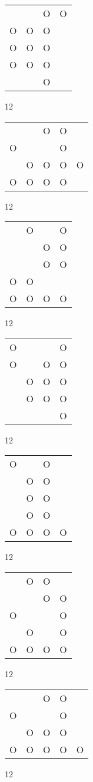 \begin{tabular}{|m{0.2cm}m{0.2cm}m{0.2cm}m{0.2cm}|}\hline
 & &O&O\\
O&O&O& \\
O&O&O& \\
O&O&O& \\
 & &O& \\
\hline\end{tabular}12
\begin{tabular}{|m{0.2cm}m{0.2cm}m{0.2cm}m{0.2cm}m{0.2cm}|}\hline
 & &O&O& \\
O& & &O& \\
 &O&O&O&O\\
O&O&O&O& \\
\hline\end{tabular}12
\begin{tabular}{|m{0.2cm}m{0.2cm}m{0.2cm}m{0.2cm}|}\hline
 &O& &O\\
 & &O&O\\
 & &O&O\\
O&O& & \\
O&O&O&O\\
\hline\end{tabular}12
\begin{tabular}{|m{0.2cm}m{0.2cm}m{0.2cm}m{0.2cm}|}\hline
O& & &O\\
O& &O&O\\
 &O&O&O\\
 &O&O&O\\
 & & &O\\
\hline\end{tabular}12
\begin{tabular}{|m{0.2cm}m{0.2cm}m{0.2cm}m{0.2cm}|}\hline
O& &O& \\
 &O&O& \\
 &O&O& \\
 &O&O& \\
O&O&O&O\\
\hline\end{tabular}12
\begin{tabular}{|m{0.2cm}m{0.2cm}m{0.2cm}m{0.2cm}|}\hline
 &O&O& \\
 & &O&O\\
O& & &O\\
 &O& &O\\
O&O&O&O\\
\hline\end{tabular}12
\begin{tabular}{|m{0.2cm}m{0.2cm}m{0.2cm}m{0.2cm}m{0.2cm}|}\hline
 & &O&O& \\
O& & &O& \\
 &O&O&O& \\
O&O&O&O&O\\
\hline\end{tabular}12
